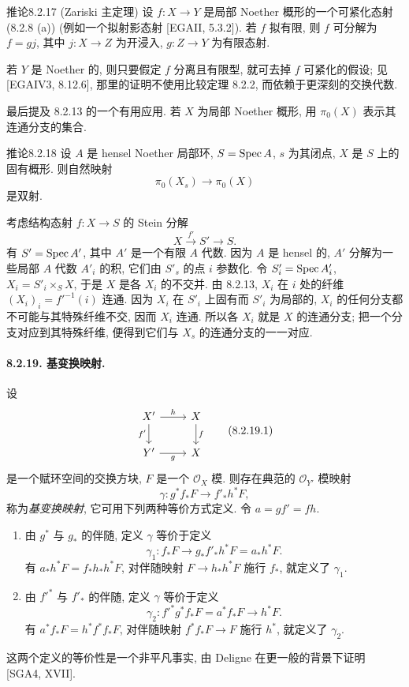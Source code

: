 \begin{origstatement}{推论}{8.2.17}\label{ch08:cor8217}
(Zariski 主定理) 设 $f:X\to Y$ 是局部 Noether 概形的一个可紧化态射 (8.2.8 (a)) (例如一个拟射影态射 [EGAII, 5.3.2]). 若 $f$ 拟有限, 则 $f$ 可分解为 $f=gj$, 其中 $j:X\to Z$ 为开浸入, $g:Z\to Y$ 为有限态射.
\end{origstatement}
若 $Y$ 是 Noether 的, 则只要假定 $f$ 分离且有限型, 就可去掉 $f$ 可紧化的假设; 见 [EGAIV3, 8.12.6], 那里的证明不使用比较定理 8.2.2, 而依赖于更深刻的交换代数.

最后提及 8.2.13 的一个有用应用. 若 $X$ 为局部 Noether 概形, 用 $\pi_0(X)$ 表示其连通分支的集合.
\begin{origstatement}{推论}{8.2.18}\label{ch08:cor8218}
设 $A$ 是 hensel Noether 局部环, $S=\operatorname{Spec} A$, $s$ 为其闭点, $X$ 是 $S$ 上的固有概形. 则自然映射
\[\pi_0(X_s)\longrightarrow\pi_0(X)\]
是双射.
\end{origstatement}
考虑结构态射 $f:X\to S$ 的 Stein 分解
\[X\xrightarrow{f'}S'\longrightarrow S.\]
有 $S'=\operatorname{Spec} A'$, 其中 $A'$ 是一个有限 $A$ 代数. 因为 $A$ 是 hensel 的, $A'$ 分解为一些局部 $A$ 代数 $A'_i$ 的积, 它们由 $S'_s$ 的点 $i$ 参数化. 令 $S'_i=\operatorname{Spec} A'_i$, $X_i=S'_i\times_SX$, 于是 $X$ 是各 $X_i$ 的不交并. 由 8.2.13, $X_i$ 在 $i$ 处的纤维 $(X_i)_i=f'^{-1}(i)$ 连通. 因为 $X_i$ 在 $S'_i$ 上固有而 $S'_i$ 为局部的, $X_i$ 的任何分支都不可能与其特殊纤维不交, 因而 $X_i$ 连通. 所以各 $X_i$ 就是 $X$ 的连通分支; 把一个分支对应到其特殊纤维, 便得到它们与 $X_s$ 的连通分支的一一对应.

\paragraph{8.2.19. 基变换映射.}
设
\begin{equation}
\begin{tikzcd}X'\arrow[r,"h"]\arrow[d,"f'"']&X\arrow[d,"f"]\\Y'\arrow[r,"g"']&X\end{tikzcd}
\tag{8.2.19.1}\label{ch08:eq82191}\end{equation}
是一个赋环空间的交换方块, $F$ 是一个 $\mathcal O_X$ 模. 则存在典范的 $\mathcal O_{Y'}$ 模映射
\begin{equation}\gamma:g^*f_*F\longrightarrow f'_*h^*F,\tag{8.2.19.2}\label{ch08:eq82192}\end{equation}
称为\emph{基变换映射}, 它可用下列两种等价方式定义. 令 $a=gf'=fh$.
\begin{enumerate}
\item[(a)] 由 $g^*$ 与 $g_*$ 的伴随, 定义 $\gamma$ 等价于定义
\[\gamma_1:f_*F\longrightarrow g_*f'_*h^*F=a_*h^*F.\]
有 $a_*h^*F=f_*h_*h^*F$, 对伴随映射 $F\to h_*h^*F$ 施行 $f_*$, 就定义了 $\gamma_1$.
\item[(b)] 由 $f'^*$ 与 $f'_*$ 的伴随, 定义 $\gamma$ 等价于定义
\[\gamma_2:f'^*g^*f_*F=a^*f_*F\longrightarrow h^*F.\]
有 $a^*f_*F=h^*f^*f_*F$, 对伴随映射 $f^*f_*F\to F$ 施行 $h^*$, 就定义了 $\gamma_2$.
\end{enumerate}
这两个定义的等价性是一个非平凡事实, 由 Deligne 在更一般的背景下证明 [SGA4, XVII].

